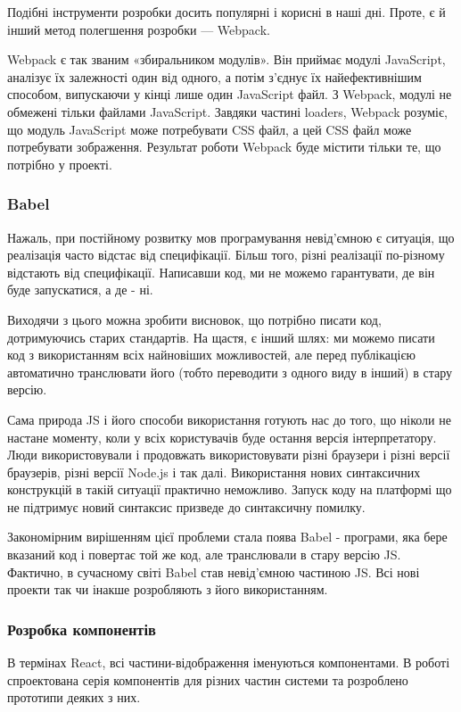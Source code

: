 Подібні інструменти розробки досить популярні і корисні в наші дні. Проте, є й інший метод полегшення розробки — Webpack.

Webpack є так званим «збиральником модулів». Він приймає модулі JavaScript, аналізує їх залежності один від одного, а потім з'єднує їх найефективнішим способом, випускаючи у кінці лише один JavaScript файл. З Webpack, модулі не обмежені тільки файлами JavaScript. Завдяки частині loaders, Webpack розуміє, що модуль JavaScript може потребувати CSS файл, а цей CSS файл може потребувати зображення. Результат роботи Webpack буде містити тільки те, що потрібно у проекті.

\subsubsection{Babel}

Нажаль, при постійному розвитку мов програмування невід'ємною є ситуація, що реалізація часто відстає від специфікації. Більш того, різні реалізації по-різному відстають від специфікації. Написавши код, ми не можемо гарантувати, де він буде запускатися, а де - ні.

Виходячи з цього можна зробити висновок, що потрібно писати код, дотримуючись старих стандартів. На щастя, є інший шлях: ми можемо писати код з використанням всіх найновіших можливостей, але перед публікацією автоматично транслювати його (тобто переводити з одного виду в інший) в стару версію. 

Сама природа JS і його способи використання готують нас до того, що ніколи не настане моменту, коли у всіх користувачів буде остання версія інтерпретатору. Люди використовували і продовжать використовувати різні браузери і різні версії браузерів, різні версії Node.js і так далі. Використання нових синтаксичних конструкцій в такій ситуації практично неможливо. Запуск коду на платформі що не підтримує новий синтаксис призведе до синтаксичну помилку. 

Закономірним вирішенням цієї проблеми стала поява Babel - програми, яка бере вказаний код і повертає той же код, але транслювали в стару версію JS. Фактично, в сучасному світі Babel став невід'ємною частиною JS. Всі нові проекти так чи інакше розробляють з його використанням.

\subsubsection{Розробка компонентів}

В термінах React, всі частини-відображення іменуються компонентами. В роботі спроектована серія компонентів для різних частин системи та розроблено прототипи деяких з них. 

